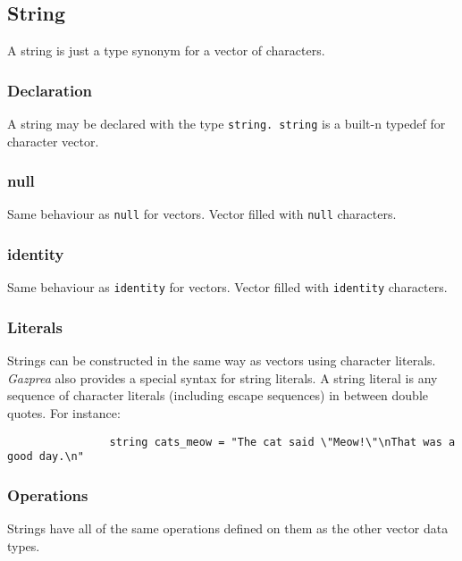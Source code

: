 \documentclass[../../gazprea.tex]{subfiles}
\begin{document}
	\subsection{String}\label{sec:string}

		A string is just a type synonym for a vector of characters.

		\subsubsection{Declaration}

			A string may be declared with the type \texttt{string. string} is a built-n typedef for character vector.

		\subsubsection{null}

			Same behaviour as \texttt{null} for vectors. Vector filled with \texttt{null} characters.

		\subsubsection{identity}

			Same behaviour as \texttt{identity} for vectors. Vector filled with \texttt{identity} characters.

		\subsubsection{Literals}

			Strings can be constructed in the same way as vectors using character literals.  \textit{Gazprea} also
			provides a special syntax for string literals. A string literal is any sequence of character literals
			(including escape sequences) in between double quotes. For instance:

			\begin{lstlisting}
				string cats_meow = "The cat said \"Meow!\"\nThat was a good day.\n"
			\end{lstlisting}

		\subsubsection{Operations}

			Strings have all of the same operations defined on them as the other vector data types.
\end{document}
